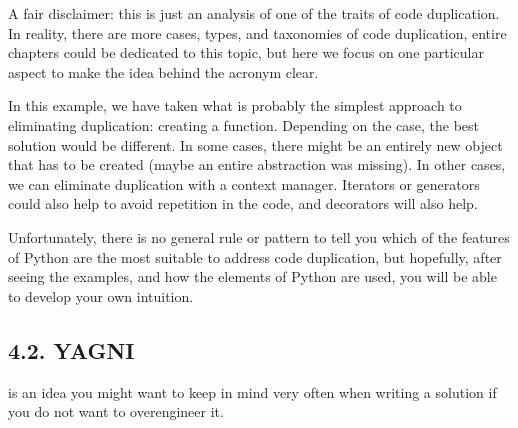 \documentclass[a4paper,10pt,english]{sphinxmanual}
\begin{document}
\begin{sphinxVerbatim}[commandchars=\\\{\}]
 
               

 
       
       
\end{sphinxVerbatim}

A fair disclaimer: this is just an analysis of one of the traits of code duplication. In reality, there are
more cases, types, and taxonomies of code duplication, entire chapters could be dedicated to this topic, but
here we focus on one particular aspect to make the idea behind the acronym clear.

In this example, we have taken what is probably the simplest approach to eliminating duplication: creating a
function. Depending on the case, the best solution would be different. In some cases, there might be an
entirely new object that has to be created (maybe an entire abstraction was missing). In other cases, we can
eliminate duplication with a context manager. Iterators or generators could also help to avoid repetition in
the code, and decorators will also help.

Unfortunately, there is no general rule or pattern to tell you which of the features of Python are the most
suitable to address code duplication, but hopefully, after seeing the examples, and how the elements of Python
are used, you will be able to develop your own intuition.


\subsection{4.2. YAGNI}
\label{\detokenize{chapters/3_general_traits/index:yagni}}
 is an idea you might want to keep in mind very often when
writing a solution if you do not want to over\sphinxhyphen{}engineer it.
\end{document}
